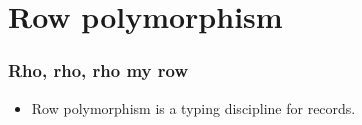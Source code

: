 \section{Row polymorphism}





\begin{frame}
  \frametitle{Rho, rho, rho my row}
  \begin{itemize}
    \item Row polymorphism is a typing discipline for records.
  \end{itemize}
\end{frame}
